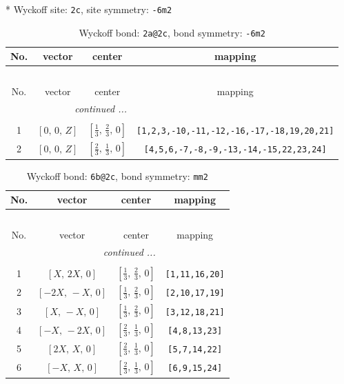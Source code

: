 \documentclass[fleqn,8pt]{jsarticle}
\begin{document}
* Wyckoff site: {\tt 2c}, site symmetry: {\tt -6m2}
\renewcommand{\arraystretch}{1.2}
\begin{longtable}{cccc}
\caption{Wyckoff bond: {\tt 2a@2c}, bond symmetry: {\tt -6m2}}
 \\
 \hline \hline
No. & vector & center & mapping \\ \hline \endfirsthead

\multicolumn{3}{l}{\tablename\ \thetable{}} \\
 \hline \hline
No. & vector & center & mapping \\ \hline \endhead

 \hline \hline
\multicolumn{3}{r}{\footnotesize\it continued ...} \\ \endfoot

 \hline \hline
\multicolumn{3}{r}{} \\ \endlastfoot

1 & $\left[ 0,\, 0,\, Z \right]$ & $\left[ \frac{1}{3},\, \frac{2}{3},\, 0 \right]$ & {\tt [1,2,3,-10,-11,-12,-16,-17,-18,19,20,21]} \\ \hline
2 & $\left[ 0,\, 0,\, Z \right]$ & $\left[ \frac{2}{3},\, \frac{1}{3},\, 0 \right]$ & {\tt [4,5,6,-7,-8,-9,-13,-14,-15,22,23,24]} \\
\end{longtable}
\renewcommand{\arraystretch}{1.2}
\begin{longtable}{cccc}
\caption{Wyckoff bond: {\tt 6b@2c}, bond symmetry: {\tt mm2}}
 \\
 \hline \hline
No. & vector & center & mapping \\ \hline \endfirsthead

\multicolumn{3}{l}{\tablename\ \thetable{}} \\
 \hline \hline
No. & vector & center & mapping \\ \hline \endhead

 \hline \hline
\multicolumn{3}{r}{\footnotesize\it continued ...} \\ \endfoot

 \hline \hline
\multicolumn{3}{r}{} \\ \endlastfoot

1 & $\left[ X,\, 2 X,\, 0 \right]$ & $\left[ \frac{1}{3},\, \frac{2}{3},\, 0 \right]$ & {\tt [1,11,16,20]} \\ \hline
2 & $\left[ - 2 X,\, - X,\, 0 \right]$ & $\left[ \frac{1}{3},\, \frac{2}{3},\, 0 \right]$ & {\tt [2,10,17,19]} \\ \hline
3 & $\left[ X,\, - X,\, 0 \right]$ & $\left[ \frac{1}{3},\, \frac{2}{3},\, 0 \right]$ & {\tt [3,12,18,21]} \\ \hline
4 & $\left[ - X,\, - 2 X,\, 0 \right]$ & $\left[ \frac{2}{3},\, \frac{1}{3},\, 0 \right]$ & {\tt [4,8,13,23]} \\ \hline
5 & $\left[ 2 X,\, X,\, 0 \right]$ & $\left[ \frac{2}{3},\, \frac{1}{3},\, 0 \right]$ & {\tt [5,7,14,22]} \\ \hline
6 & $\left[ - X,\, X,\, 0 \right]$ & $\left[ \frac{2}{3},\, \frac{1}{3},\, 0 \right]$ & {\tt [6,9,15,24]} \\
\end{longtable}
\end{document}
